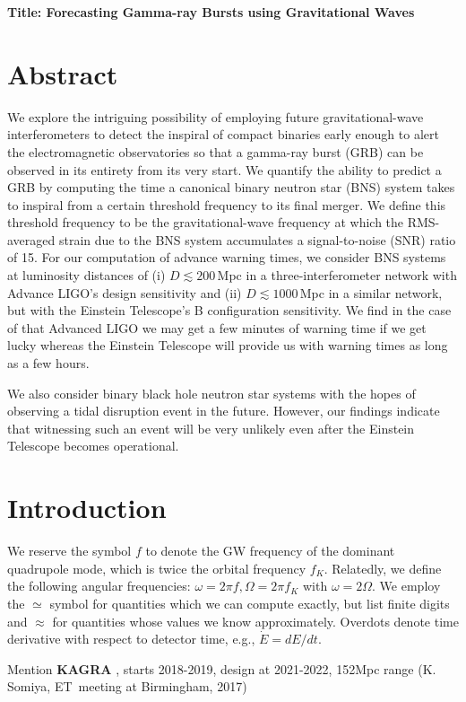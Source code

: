 \documentclass[11pt,a4paper]{article}
\begin{document}
{\bf Title: Forecasting Gamma-ray Bursts using Gravitational Waves}
\section{Abstract}
We explore the intriguing possibility of employing future gravitational-wave interferometers to detect the inspiral of compact binaries early enough to alert the electromagnetic observatories so that a gamma-ray burst (GRB) can be observed in its entirety from its very start.
We quantify the ability to predict a GRB by computing the time a canonical binary neutron star (BNS) system takes to inspiral from a certain threshold frequency to its final merger. We define this threshold frequency to be the gravitational-wave frequency at which the RMS-averaged strain due to the BNS system accumulates a signal-to-noise (SNR) ratio of 15. For our computation of advance warning times, we consider BNS systems at luminosity distances of (i) $D\lesssim200\,$Mpc in a three-interferometer network with Advance LIGO's design sensitivity and (ii) $D \lesssim 1000\,$Mpc in a similar network, but with the Einstein Telescope's B configuration
sensitivity. We find in the case of that Advanced LIGO we may get a few minutes of warning time if we get lucky whereas the Einstein Telescope will provide us
with warning times as long as a few hours.

We also consider binary black hole neutron star systems with the hopes of observing a tidal disruption event in the future. However, our findings indicate that
witnessing such an event will be very unlikely even after the Einstein Telescope becomes operational.

\section{Introduction}\label{Sec:Intro}
We reserve the symbol $f$ to denote the GW frequency of the dominant quadrupole mode, which is twice the orbital frequency $f_K$. 
Relatedly, we define the following angular frequencies: $\omega = 2\pi f, \Omega=2\pi f_K$ with $\omega=2\Omega$.
We employ the $\simeq$ symbol for quantities which we can compute exactly, but list finite digits and $\approx$ for quantities whose values we know approximately.
Overdots denote time derivative with respect to detector time, e.g., $\dot{E} =dE/dt$.

Mention {\bf KAGRA} \cite{KAGRA, KAGRA2}, starts 2018-2019, design at 2021-2022, 152Mpc range (K. Somiya, ET meeting at Birmingham, 2017)
\end{document}
